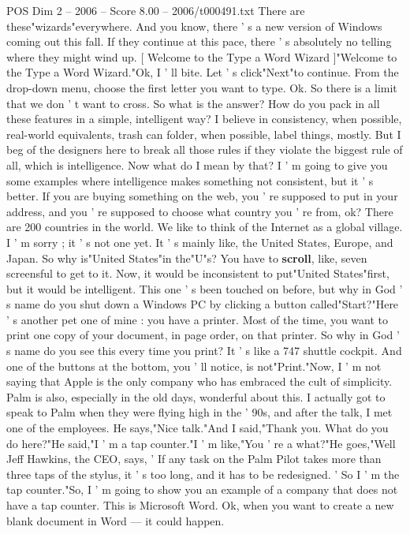 \begin{textsample}{POS Dim 2 – 2006 – Score 8.00 – 2006/t000491.txt}
There are these"wizards"everywhere.
And you know, there ' s a new version of Windows coming out this fall.
If they continue at this pace, there ' s absolutely no telling where they might wind up. [ Welcome to the Type a Word Wizard ]"Welcome to the Type a Word Wizard."Ok, I ' ll bite.
Let ' s click"Next"to continue.
From the drop-down menu, choose the first letter you want to type.
Ok.
So there is a limit that we don ' t want to cross.
So what is the answer?
How do you pack in all these features in a simple, intelligent way?
I believe in consistency, when possible, real-world equivalents, trash can folder, when possible, label things, mostly.
But I beg of the designers here to break all those rules if they violate the biggest rule of all, which is intelligence.
Now what do I mean by that?
I ' m going to give you some examples where intelligence makes something not consistent, but it ' s better.
If you are buying something on the web, you ' re supposed to put in your address, and you ' re supposed to choose what country you ' re from, ok?
There are 200 countries in the world.
We like to think of the Internet as a global village.
I ' m sorry ; it ' s not one yet.
It ' s mainly like, the United States, Europe, and Japan.
So why is"United States"in the"U"s?
You have to \textbf{scroll}, like, seven screensful to get to it.
Now, it would be inconsistent to put"United States"first, but it would be intelligent.
This one ' s been touched on before, but why in God ' s name do you shut down a Windows PC by clicking a button called"Start?"Here ' s another pet one of mine : you have a printer.
Most of the time, you want to print one copy of your document, in page order, on that printer.
So why in God ' s name do you see this every time you print?
It ' s like a 747 shuttle cockpit.
And one of the buttons at the bottom, you ' ll notice, is not"Print."Now, I ' m not saying that Apple is the only company who has embraced the cult of simplicity.
Palm is also, especially in the old days, wonderful about this.
I actually got to speak to Palm when they were flying high in the ' 90s, and after the talk, I met one of the employees.
He says,"Nice talk."And I said,"Thank you.
What do you do here?"He said,"I ' m a tap counter."I ' m like,"You ' re a what?"He goes,"Well Jeff Hawkins, the CEO, says, ' If any task on the Palm Pilot takes more than three taps of the stylus, it ' s too long, and it has to be redesigned. ' So I ' m the tap counter."So, I ' m going to show you an example of a company that does not have a tap counter.
This is Microsoft Word.
Ok, when you want to create a new blank document in Word — it could happen.

\end{textsample}
